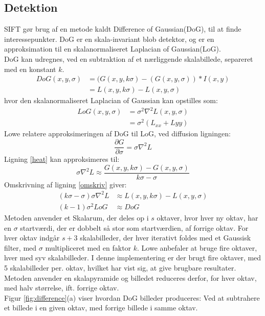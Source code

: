 \subsection{Detektion}
SIFT gør brug af en metode kaldt Difference of Gaussian(DoG), til at finde interessepunkter. DoG er en skala-invariant blob detektor, og er en approksimation til en skalanormaliseret Laplacian of Gaussian(LoG). \\ DoG kan udregnes, ved en subtraktion af et nærliggende skalabillede, separeret med en konstant $k$.
\begin{equation}
\begin{split}
DoG(x,y,\sigma) &= (G(x,y,k\sigma)-(G(x,y,\sigma))\ast I(x,y) \\
           &= L(x,y,k \sigma)-L(x,y,\sigma)
\end{split}
\label{dog}
\end{equation}
hvor den skalanormaliseret Laplacian of Gaussian kan opstilles som:
\begin{equation}
\begin{split}
LoG(x,y,\sigma)&=\sigma^2\nabla^2L(x,y,\sigma) \\
&= \sigma^2(L_{xx}+L{yy})
\end{split}
\end{equation}
Lowe relatere approksimeringen af DoG til LoG, ved diffusion ligningen:
\begin{equation}
\dfrac{\partial G}{\partial \sigma} = \sigma \nabla^2L
\label{heat}
\end{equation}
Ligning \eqref{heat} kan approksimeres til:
\begin{equation}
\sigma \nabla^2L \approx \frac{G(x,y,k\sigma) - G(x,y,\sigma)}{k\sigma-\sigma}
\label{omskriv}
\end{equation}
Omskrivning af ligning \eqref{omskriv} giver:
\begin{equation}
\begin{split}
(k\sigma-\sigma)\sigma\nabla^2L &\approx L(x,y,k\sigma)-L(x,y,\sigma) \\
(k-1)\sigma^2LoG &\approx DoG
\end{split}
\end{equation}
Metoden anvender et Skalarum, der deles op i $s$ oktaver, hvor hver ny oktav, har en $\sigma$ startværdi, der er dobbelt så stor som startværdien, af forrige oktav. For hver oktav indgår $s+3$ skalabilleder, der hver iterativt foldes med et Gaussisk filter, med $\sigma$ multipliceret med en faktor $k$. Lowe anbefaler at bruge fire oktaver, hver med syv skalabilleder. I denne implementering er der brugt fire oktaver, med 5 skalabilleder per. oktav, hvilket har vist sig, at give brugbare resultater. Metoden anvender en skalapyramide og billedet reduceres derfor, for hver oktav, med halv størrelse, ift. forrige oktav. \\ Figur \ref{fig:difference}(a) viser hvordan DoG billeder produceres: Ved at subtrahere et billede i en given oktav, med forrige billede i samme oktav.
